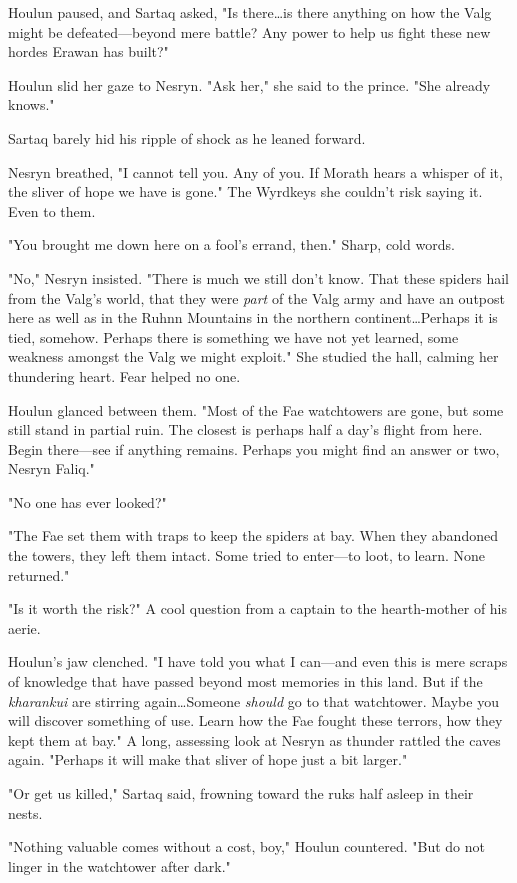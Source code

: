 Houlun paused, and Sartaq asked, "Is there\ldots is there anything on how the Valg might be defeated---beyond mere battle?
Any power to help us fight these new hordes Erawan has built?"

Houlun slid her gaze to Nesryn.
"Ask her," she said to the prince.
"She already knows."

Sartaq barely hid his ripple of shock as he leaned forward.

Nesryn breathed, "I cannot tell you.
Any of you.
If Morath hears a whisper of it, the sliver of hope we have is gone."
The Wyrdkeys  she couldn't risk saying it.
Even to them.

"You brought me down here on a fool's errand, then."
Sharp, cold words.

"No," Nesryn insisted.
"There is much we still don't know.
That these spiders hail from the Valg's world, that they were \emph{part} of the Valg army and have an outpost here as well as in the Ruhnn Mountains in the northern continent\ldots Perhaps it is tied, somehow.
Perhaps there is something we have not yet learned, some weakness amongst the Valg we might exploit."
She studied the hall, calming her thundering heart.
Fear helped no one.

Houlun glanced between them.
"Most of the Fae watchtowers are gone, but some still stand in partial ruin.
The closest is perhaps half a day's flight from here.
Begin there---see if anything remains.
Perhaps you might find an answer or two, Nesryn Faliq."

"No one has ever looked?"

"The Fae set them with traps to keep the spiders at bay.
When they abandoned the towers, they left them intact.
Some tried to enter---to loot, to learn.
None returned."

"Is it worth the risk?"
A cool question from a captain to the hearth-mother of his aerie.

Houlun's jaw clenched.
"I have told you what I can---and even this is mere scraps of knowledge that have passed beyond most memories in this land.
But if the \emph{kharankui} are stirring again\ldots Someone \emph{should} go to that watchtower.
Maybe you will discover something of use.
Learn how the Fae fought these terrors, how they kept them at bay."
A long, assessing look at Nesryn as thunder rattled the caves again.
"Perhaps it will make that sliver of hope just a bit larger."

"Or get us killed," Sartaq said, frowning toward the ruks half asleep in their nests.

"Nothing valuable comes without a cost, boy," Houlun countered.
"But do not linger in the watchtower after dark."

